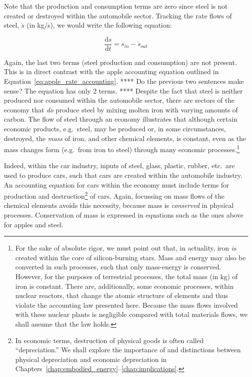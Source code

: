 Note that the production and consumption terms are zero
since steel is not created or destroyed within the automobile
sector. Tracking the rate flows of steel, 
$\dot{s}$ (in kg/s),
we would write the following equation:

\begin{equation}
	\frac{\mathrm{d}s}{\mathrm{d}t}
	= \dot{s}_{in}
	- \dot{s}_{out}
\end{equation}

Again, the last two terms (steel production and consumption) are not present. 
This is in direct contrast with the apple 
accounting equation outlined in Equation~\ref{eq:apple_rate_accounting}. 
**** Do the previous two sentences make sense? The equation has only 2 terms. ****
Despite the fact that steel is neither produced nor consumed within the automobile sector, 
there are sectors of the economy that \emph{do} produce steel
by mixing molten
iron with varying amounts of carbon. 
The flow of steel through an economy illustrates that although certain economic
products, e.g.\ steel, may be produced or, in some circumstances, destroyed, the
\emph{mass} of iron, and other chemical elements, is constant,
even as the mass changes form (e.g.\ from iron to steel) 
through many economic processes.\footnote{For the sake of
absolute rigor, we must point out that, in actuality, iron \emph{is} created within
the core of silicon-burning stars. Mass and energy may also be converted in such processes, 
such that only mass-energy is conserved. However, for the purposes of terrestrial
processes, the total mass (in kg) of iron is constant. There are, additionally, some economic
processes, within nuclear reactors, that change the atomic structure of elements
and thus violate the accounting law presented here. Because the mass flows involved
with these nuclear plants is negligible compared with total materials flows, we
shall assume that the law holds.}


Indeed, within the car industry, inputs of steel, glass, plastic, rubber, etc.\ are used
to produce cars, such that cars are created within the automobile industry. 
An accounting equation for cars within the economy
must include terms for production and destruction\footnote{In economic terms,
destruction of physical goods is often called ``depreciation.'' We shall 
explore the importance of and distinctions between 
physical depreciation and economic depreciation 
in Chapters~\ref{chap:embodied_energy}--\ref{chap:implications}.}
of cars.
Again, focussing on mass flows of the chemical elements avoids this necessity, 
because mass is \emph{conserved} in physical processes. 
Conservation of mass is expressed in equations such as the ones above
for apples and steel. 

